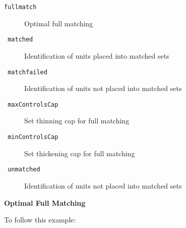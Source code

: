 \documentclass[12pt,twoside]{article}
\begin{document}
\bigskip
\begin{description}
\item[\texttt{fullmatch}]  \textrm{Optimal full matching}
\item[\texttt{
matched}]   \textrm{Identification of units placed into matched sets}
\item[\texttt{
matchfailed}]  \textrm{Identification of units not placed into matched
sets }
\item[\texttt{
maxControlsCap}]  \textrm{Set thinning cap for full matching}
\item[\texttt{
minControlsCap}]  \textrm{Set thickening cap for full matching}
\item[\texttt{
unmatched}]  \textrm{Identification of units not placed into matched
sets}
\end{description}

\bigskip


{\rmfamily\bfseries
Optimal Full Matching}


\bigskip

{\ttfamily
\textrm{To follow this example:}}


\bigskip
\end{document}
